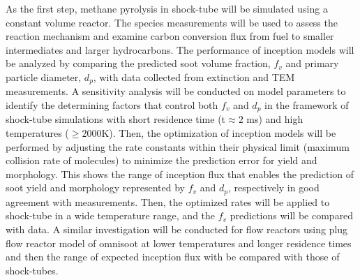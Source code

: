 As the first step, methane pyrolysis in shock-tube will be simulated using a constant volume reactor. The species measurements will be used to assess the reaction mechanism and examine carbon conversion flux from fuel to smaller intermediates and larger hydrocarbons. The performance of inception models will be analyzed by comparing the predicted soot volume fraction, $f_v$ and primary particle diameter, $d_p$, with data collected from extinction and TEM measurements. A sensitivity analysis will be conducted on model parameters to identify the determining factors that control both $f_v$ and $d_p$ in the framework of shock-tube simulations with short residence time (t$\approx2$ ms) and high temperatures ($\ge 2000$K). Then, the optimization of inception models will be performed by adjusting the rate constants within their physical limit (maximum collision rate of molecules) to minimize the prediction error for yield and morphology. This shows the range of inception flux that enables the prediction of soot yield and morphology represented by $f_v$ and $d_p$, respectively in good agreement with measurements. Then, the optimized rates will be applied to shock-tube in a wide temperature range, and the $f_v$ predictions will be compared with data. A similar investigation will be conducted for flow reactors using plug flow reactor model of omnisoot at lower temperatures and longer residence times and then the range of expected inception flux with be compared with those of shock-tubes.




% 





